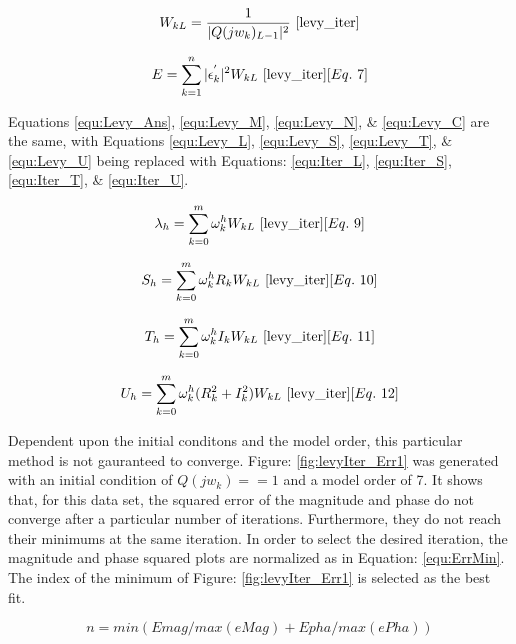 \begin{equation}
    \label{equ:iter_Weight}
    W_{kL} = \frac{1}{|Q(jw_k)_{L-1}|^2}
    ~\cite{levy_iter}
\end{equation}

\begin{equation}
    \label{equ:iter_Err}
    E = \sum_{k=1}^{n} |\epsilon _k ^{'}|^2W_{kL}
    ~\cite{levy_iter}[Eq.~7]
\end{equation}

Equations \eqref{equ:Levy_Ans}, \eqref{equ:Levy_M}, \eqref{equ:Levy_N}, \& \eqref{equ:Levy_C} are the same, with Equations \eqref{equ:Levy_L}, \eqref{equ:Levy_S}, \eqref{equ:Levy_T}, \& \eqref{equ:Levy_U} being replaced with Equations: \eqref{equ:Iter_L}, \eqref{equ:Iter_S}, \eqref{equ:Iter_T}, \& \eqref{equ:Iter_U}.

\begin{equation}
    \label{equ:Iter_L}
    \lambda _h = \sum_{k=0}^{m} \omega _k ^hW_{kL}
    ~\cite{levy_iter}[Eq.~9]
\end{equation}

\begin{equation}
    \label{equ:Iter_S}
    S_h = \sum_{k=0}^{m} \omega _k ^h R_kW_{kL}
    ~\cite{levy_iter}[Eq.~10]
\end{equation}

\begin{equation}
    \label{equ:Iter_T}
    T_h = \sum_{k=0}^{m} \omega _k ^h I_kW_{kL}
    ~\cite{levy_iter}[Eq.~11]
\end{equation}

\begin{equation}
    \label{equ:Iter_U}
    U_h = \sum_{k=0}^{m} \omega _k ^h (R_k ^2 + I_k ^2)W_{kL}
    ~\cite{levy_iter}[Eq.~12]
\end{equation}

Dependent upon the initial conditons and the model order, this particular method is not gauranteed to converge. Figure: \ref{fig:levyIter_Err1} was generated with an initial condition of $Q(jw_k) == 1$ and a model order of 7. It shows that, for this data set, the squared error of the magnitude and phase do not converge after a particular number of iterations. Furthermore, they do not reach their minimums at the same iteration. In order to select the desired iteration, the magnitude and phase squared plots are normalized as in Equation: \eqref{equ:ErrMin}. The index of the minimum of Figure: \ref{fig:levyIter_Err1} is selected as the best fit.

\begin{equation}
\label{equ:ErrMin}
n = min(Emag/max(eMag) + Epha/max(ePha))
\end{equation}

